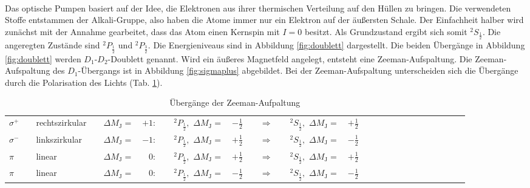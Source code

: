 %
%
\\Das optische Pumpen basiert auf der Idee, die Elektronen aus ihrer thermischen Verteilung auf den Hüllen zu bringen.
Die verwendeten Stoffe entstammen der Alkali-Gruppe, also haben die Atome immer nur ein Elektron auf der äußersten Schale.
Der Einfachheit halber wird zunächst mit der Annahme gearbeitet, dass das Atom einen Kernspin mit $I=0$ besitzt.
Als Grundzustand ergibt sich somit $^{2}S_{\frac{1}{2}}$.
Die angeregten Zustände sind $^{2}P_{\frac{1}{2}}$ und $^{2}P_{\frac{3}{2}}$.
Die Energieniveaus sind in Abbildung \ref{fig:doublett} dargestellt.
Die beiden Übergänge in Abbildung \ref{fig:doublett} werden $D_{1}$-$D_{2}$-Doublett genannt.
Wird ein äußeres Magnetfeld angelegt, entsteht eine Zeeman-Aufspaltung.
Die Zeeman-Aufspaltung des $D_{1}$-Übergangs ist in Abbildung \ref{fig:sigmaplus} abgebildet.
Bei der Zeeman-Aufspaltung unterscheiden sich die Übergänge durch die Polarisation des Lichts (Tab. \ref{tab:polarisation}).
\begin{table}[h!]
  \centering
  \caption{Übergänge der Zeeman-Aufpaltung}
  \label{tab:polarisation}
  \begin{tabular}{l l l l l r l l r l c l l r l l l l l l l l l l l l}
    \toprule
$\sigma^{+}$ && rechtszirkular && $\Delta M_{\text{J}}=$ & $+1:$  &&  $^{2}P_{\frac{1}{2}},$ $\Delta M_{\text{J}}=$ & $-\frac{1}{2}$ &&$\Rightarrow$&& $^{2}S_{\frac{1}{2}},$ $\Delta M_{\text{J}}=$ & $+\frac{1}{2}$ \\
$\sigma^{-}$ && linkszirkular  && $\Delta M_{\text{J}}=$ & $-1:$  &&  $^{2}P_{\frac{1}{2}},$ $\Delta M_{\text{J}}=$ & $+\frac{1}{2}$  &&$\Rightarrow$&& $^{2}S_{\frac{1}{2}},$ $\Delta M_{\text{J}}=$ & $-\frac{1}{2}$ \\
$\pi       $ && linear         && $\Delta M_{\text{J}}=$ & $ 0:$  &&  $^{2}P_{\frac{1}{2}},$ $\Delta M_{\text{J}}=$ & $+\frac{1}{2}$  &&$\Rightarrow$&& $^{2}S_{\frac{1}{2}},$ $\Delta M_{\text{J}}=$ & $+\frac{1}{2}$ \\
$\pi$        && linear         && $\Delta M_{\text{J}}=$ & $ 0:$  &&  $^{2}P_{\frac{1}{2}},$ $\Delta M_{\text{J}}=$ & $-\frac{1}{2}$ &&$\Rightarrow$&& $^{2}S_{\frac{1}{2}},$ $\Delta M_{\text{J}}=$ & $-\frac{1}{2}$ \\
    \bottomrule
  \end{tabular}
\end{table}
